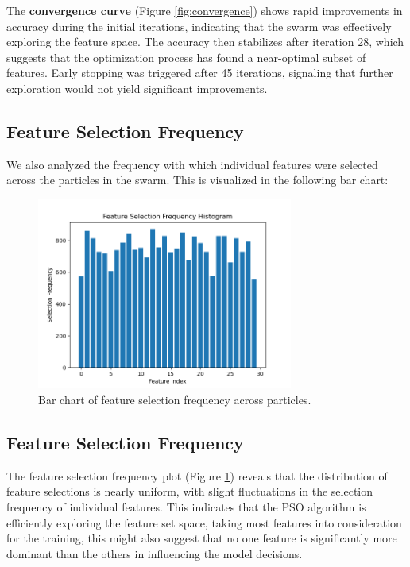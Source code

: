 \documentclass[12pt]{article}
\begin{document}
The \textbf{convergence curve} (Figure \ref{fig:convergence}) shows rapid improvements in accuracy during the initial iterations, indicating that the swarm was effectively exploring the feature space. The accuracy then stabilizes after iteration 28, which suggests that the optimization process has found a near-optimal subset of features. Early stopping was triggered after 45 iterations, signaling that further exploration would not yield significant improvements.

\subsection{Feature Selection Frequency}

We also analyzed the frequency with which individual features were selected across the particles in the swarm. This is visualized in the following bar chart:

\begin{figure}[H]
    \centering
    \includegraphics[width=0.75\textwidth]{feature_selection_frequency.png}
    \caption{Bar chart of feature selection frequency across particles.}
    \label{fig:feature_freq}
\end{figure}

\subsection{Feature Selection Frequency}

The feature selection frequency plot (Figure \ref{fig:feature_freq}) reveals that the distribution of feature selections is nearly uniform, with slight fluctuations in the selection frequency of individual features. This indicates that the PSO algorithm is efficiently exploring the feature set space, taking most features into consideration for the training, this might also suggest that no one feature is significantly more dominant than the others in influencing the model decisions. 
\end{document}
